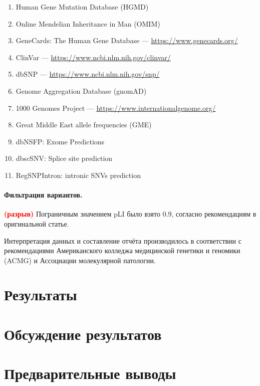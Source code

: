 \documentclass[a4paper,12pt]{article}
\newcommand{\spacing}{\textcolor{red}{\textbf{(разрыв)}}}
\begin{document}
\begin{enumerate}
\item Human Gene Mutation Database (HGMD\textregistered)\cite{hgmd}
\item Online Mendelian Inheritance in Man (OMIM\textregistered)\cite{omim}
\item GeneCards\textregistered: The Human Gene Database --- \href{https://www.genecards.org/}{https://www.genecards.org/}
\item ClinVar --- \href{https://www.ncbi.nlm.nih.gov/clinvar/}{https://www.ncbi.nlm.nih.gov/clinvar/}
\item dbSNP --- \href{https://www.ncbi.nlm.nih.gov/snp/}{https://www.ncbi.nlm.nih.gov/snp/}
\item Genome Aggregation Database (gnomAD)\cite{gnomad}
\item 1000 Genomes Project --- \href{https://www.internationalgenome.org/}{https://www.internationalgenome.org/}
\item Great Middle East allele frequencies (GME)\cite{gme}
\item dbNSFP: Exome Predictions\cite{dbnsfp}
\item dbscSNV: Splice site prediction\cite{dbscsnv}
\item RegSNPIntron: intronic SNVs prediction\cite{regsnpintron}
\end{enumerate}

\paragraph{Фильтрация вариантов.}
\spacing
Пограничным значением pLI было взято 0.9, согласно рекомендациям в оригинальной статье\cite{lek}.

Интерпретация данных и составление отчёта производилось в соответствии с рекомендациями Американского колледжа медицинской генетики и геномики (ACMG) и Ассоциации молекулярной патологии\cite{richards}.

\section{Результаты}

\section{Обсуждение результатов}

\section{Предварительные выводы}
\end{document}
